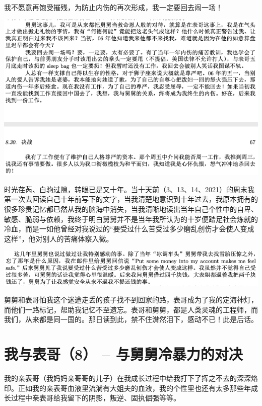 \documentclass[9pt, b5paper]{article}
\begin{document}
我不愿意再饱受摧残，为防止内伤的再次形成，我一定要回去闹一场！

\begin{center}
\includegraphics[width=.9\linewidth]{./pic/p1p66-4.png}
\end{center}

时光荏芮、白驹过隙，转眼已是又十年。当十天前（3、13、14、2021）的周末我第一次去回读自己十年前写下的文字，当我清楚地意识到十年过去，我原本拥有的很多珍贵记忆都已然从我的脑海中消失，当我清晰地读出当年自己个性中的自卑、敏感、脆弱与依赖，我终于明白舅舅并不是当年我所认为的十岁便踏足社会炼就的冷血，而是一如他曾经对我说过的“要受过什么苦受过多少磨乱创伤才会使人变成这样”，他对别人的苦痛体察入微。

\begin{center}
\includegraphics[width=.9\linewidth]{./pic/p1p122.png}
\end{center}

舅舅和表哥怕我这个迷途走丢的孩子找不到回家的路，表哥成为了我的定海神灯，而他们一路标记，帮助我记忆不至遗忘。表哥和舅舅，都是人类灵魂的工程师，而我们，从来都是同一国的。那日读到此，禁不住潸然泪下，感动不已！此是后话。 

\section{我与表哥（8） -- 与舅舅冷暴力的对决}
\label{sec:orgc695f1d}

我的亲表哥（我妈妈亲哥哥的儿子）在我成长过程中给我打下了挥之不去的深深烙印。正如我的亲表哥血液里流淌有大姐夫的血液，我的个性里也还有太多那些年成长过程中亲表哥给我留下的阴影，叛逆、固执倔强等等。
\end{document}
